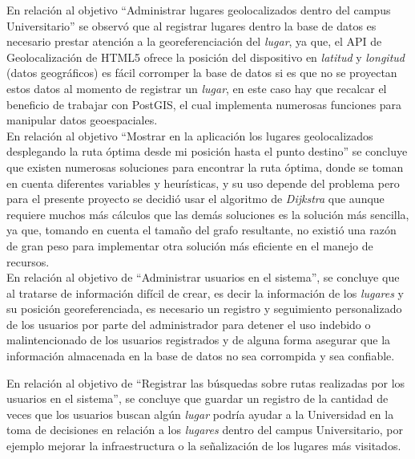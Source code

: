 
En relación al objetivo ``Administrar lugares geolocalizados dentro del campus Universitario'' se observó que al registrar lugares dentro la base de datos es necesario prestar atención a la georeferenciación del \emph{lugar}, ya que, el API de Geolocalización de HTML5 ofrece la posición del dispositivo en \emph{latitud} y \emph{longitud} (datos geográficos) es fácil corromper la base de datos si es que no se proyectan estos datos al momento de registrar un \emph{lugar}, en este caso hay que recalcar el beneficio de trabajar con  PostGIS, el cual implementa numerosas funciones para manipular datos geoespaciales. \\

 En relación al objetivo ``Mostrar en la aplicación los lugares geolocalizados desplegando la ruta óptima desde mi posición hasta el punto destino'' se concluye que existen numerosas soluciones para encontrar la ruta óptima, donde se toman en cuenta diferentes variables y heurísticas, y su uso depende del problema pero para el presente proyecto se decidió usar el algoritmo de \emph{Dijkstra} que aunque requiere muchos más cálculos que las demás soluciones es la solución más sencilla, ya que, tomando en cuenta el tamaño del grafo resultante, no existió una razón de gran peso para implementar otra solución más eficiente en el manejo de recursos.\\


 En relación al objetivo de ``Administrar usuarios en el sistema'', se concluye que al tratarse de información difícil de crear, es decir la información de los \emph{lugares} y su posición georeferenciada, es necesario un registro y seguimiento personalizado de los usuarios por parte del administrador para detener el uso indebido o malintencionado de los usuarios registrados y de alguna forma asegurar que la información almacenada en la base de datos no sea corrompida y sea confiable.


En relación al objetivo de ``Registrar las búsquedas sobre rutas realizadas por los usuarios en el sistema'', se concluye que guardar un registro de la cantidad de veces que los usuarios buscan algún \emph{lugar} podría ayudar a la Universidad en la toma de decisiones en relación a los \emph{lugares} dentro del campus Universitario, por ejemplo mejorar la infraestructura o la señalización de los lugares más visitados.


